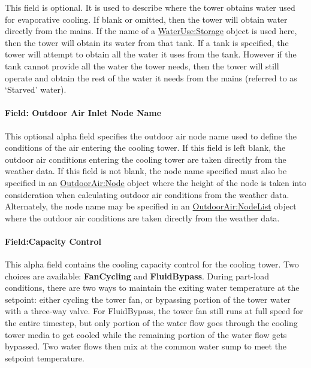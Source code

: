 This field is optional. It is used to describe where the tower obtains water used for evaporative cooling. If blank or omitted, then the tower will obtain water directly from the mains. If the name of a \hyperref[waterusestorage]{WaterUse:Storage} object is used here, then the tower will obtain its water from that tank. If a tank is specified, the tower will attempt to obtain all the water it uses from the tank. However if the tank cannot provide all the water the tower needs, then the tower will still operate and obtain the rest of the water it needs from the mains (referred to as `Starved' water).

\paragraph{Field: Outdoor Air Inlet Node Name}\label{field-outdoor-air-inlet-node-name-000}

This optional alpha field specifies the outdoor air node name used to define the conditions of the air entering the cooling tower. If this field is left blank, the outdoor air conditions entering the cooling tower are taken directly from the weather data. If this field is not blank, the node name specified must also be specified in an \hyperref[outdoorairnode]{OutdoorAir:Node} object where the height of the node is taken into consideration when calculating outdoor air conditions from the weather data. Alternately, the node name may be specified in an \hyperref[outdoorairnodelist]{OutdoorAir:NodeList} object where the outdoor air conditions are taken directly from the weather data.

\paragraph{Field:Capacity Control}\label{fieldcapacity-control}

This alpha field contains the cooling capacity control for the cooling tower. Two choices are available: \textbf{FanCycling} and \textbf{FluidBypass}. During part-load conditions, there are two ways to maintain the exiting water temperature at the setpoint: either cycling the tower fan, or bypassing portion of the tower water with a three-way valve. For FluidBypass, the tower fan still runs at full speed for the entire timestep, but only portion of the water flow goes through the cooling tower media to get cooled while the remaining portion of the water flow gets bypassed. Two water flows then mix at the common water sump to meet the setpoint temperature.

